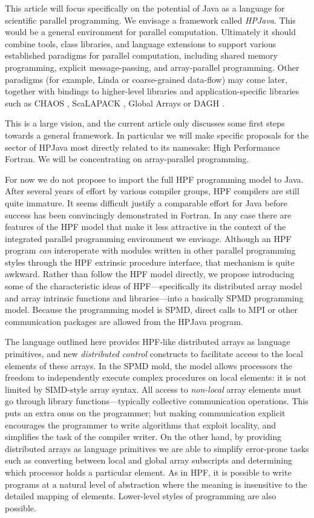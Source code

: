 This article will focus specifically on the potential of Java as a
language for scientific parallel programming.  We envisage a framework
called {\em HPJava}.  This would be a general environment for parallel
computation.  Ultimately it should combine tools, class libraries, and
language extensions to support various established paradigms for
parallel computation, including shared memory programming, explicit
message-passing, and array-parallel programming.  Other paradigms
(for example, Linda or coarse-grained data-flow) may come later, together with
bindings to higher-level libraries and application-specific libraries
such as CHAOS \cite{CHAOS}, ScaLAPACK \cite{ScaLAPACK},
Global Arrays \cite{Global_Arrays} or DAGH \cite{HDDA_DAGH}.

This is a large vision, and the current article only discusses some
first steps towards a general framework.  In particular we will make
specific proposals for the sector of HPJava most directly related to
its namesake: High Performance Fortran.  We will be concentrating on
array-parallel programming.

For now we do not propose to import
the full HPF programming model to Java.  After several years of effort by
various compiler groups, HPF compilers are still quite immature.
It seems difficult justify a comparable effort for Java before success
has been convincingly demonstrated in Fortran.  In any case there are
features of the HPF model that make it less attractive in the context of the
integrated parallel programming environment we envisage.
Although an HPF program {\em can} interoperate with modules
written in other parallel programming styles through the HPF extrinsic
procedure interface, that mechanism is quite awkward.
Rather than follow the HPF model directly, we propose introducing some
of the characteristic ideas of HPF---specifically its distributed array
model and array intrinsic functions and libraries---into a basically
SPMD programming model.  Because the programming model is SPMD, direct
calls to MPI \cite{Experiments_HPJava} or other communication
packages are allowed from the HPJava program.

The language outlined here provides HPF-like distributed
arrays as language primitives, and new {\em distributed control}
constructs to facilitate access to the local elements of these arrays.
In the SPMD mold, the model allows processors the freedom to
independently execute complex procedures on local elements: it is not
limited by SIMD-style array syntax.
All access to {\em non-local} array elements must go through
library functions---typically collective communication operations.
This puts an extra onus on the programmer; but making communication
explicit encourages the programmer to write algorithms that exploit
locality, and simplifies the task of the compiler writer.
On the other hand, by providing distributed arrays as language
primitives we are able to simplify error-prone tasks
such as converting between local and global array subscripts and
determining which processor holds a particular element.
As in HPF, it is possible to write programs at a natural level of
abstraction where the meaning is insensitive to the detailed mapping of
elements.  Lower-level styles of programming are also possible.

